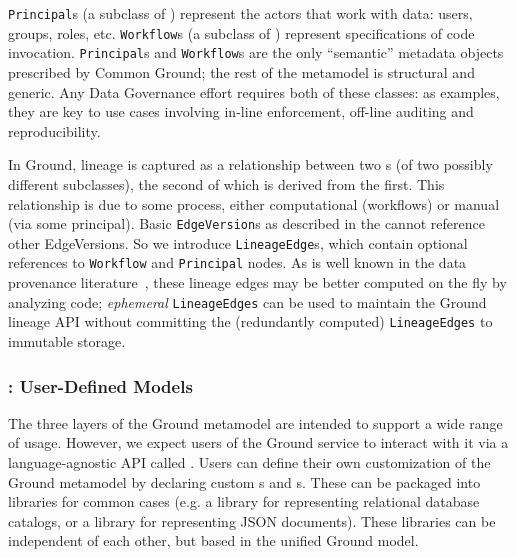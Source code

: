 \documentclass{sig-alternate}
\begin{document}
\texttt{Principal}s (a subclass of \thing) represent the actors that work with data:  users, groups, roles, etc. 
\texttt{Workflow}s (a subclass of {\graph}) represent specifications of code invocation.
\texttt{Principal}s and \texttt{Workflow}s
are the only ``semantic'' metadata objects prescribed by Common Ground; the rest of the metamodel is 
 structural and generic.
Any Data Governance effort requires both of these classes: as examples, they are key to use cases involving
in-line enforcement, off-line auditing and reproducibility.



In Ground, lineage
is captured as a relationship between two {\version}s (of two possibly different subclasses), the second of which is derived from the
first. This relationship is due to some process, either computational
(workflows) or manual (via some principal). Basic \texttt{EdgeVersion}s as described
in the \mantle cannot reference other {EdgeVersion}s.  
So we introduce \texttt{LineageEdge}s, which contain 
optional references to \texttt{Workflow} and \texttt{Principal} nodes. As is well known in the data provenance literature~\cite{cheney2009provenance}, these lineage edges may be better computed on the fly by analyzing 
code; \emph{ephemeral} \texttt{LineageEdges} can be used to maintain the Ground lineage API without committing the (redundantly computed) \texttt{LineageEdges} to immutable storage.

\subsubsection{\groundwire: User-Defined Models}
The three layers of the Ground metamodel are intended to support a wide range of usage.
However, we expect users of the Ground service to interact with it via a language-agnostic API called \groundwire.  Users can define their own
customization of the Ground metamodel by declaring custom {\structure}s and {\gtag}s.  
These can be packaged into libraries for common cases (e.g. a library for representing
relational database catalogs, or a library for representing JSON documents).  These libraries can 
be independent of each other, but based in the unified Ground model.  
\end{document}
